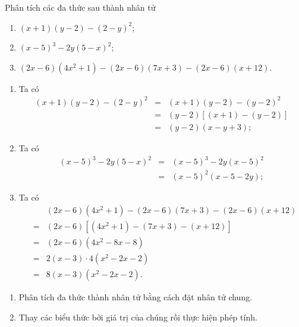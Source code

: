 \begin{vd}
		Phân tích các đa thức sau thành nhân tử
	\begin{enumerate}
			\item $(x+1)(y-2)-(2-y)^2$;
		\item $(x-5)^3 -2y(5-x)^2$;
		\item $(2x-6)(4x^2+1)- (2x-6)(7x+3)-(2x-6)(x+12)$.
	\end{enumerate}
	\loigiai
	{
		\begin{enumerate}
			\item Ta có  {\allowdisplaybreaks\begin{eqnarray*}
				(x+1)(y-2)-(2-y)^2 &=& (x+1)(y-2)-(y-2)^2 \\
				&=& (y-2)[(x+1)-(y-2)]\\
				&=& (y-2)(x-y+3);
			\end{eqnarray*}} 
			\item Ta có  {\allowdisplaybreaks\begin{eqnarray*}
				(x-5)^3 -2y(5-x)^2 &=& (x-5)^3 -2y(x-5)^2\\
				&=& (x-5)^2 (x-5-2y);
			\end{eqnarray*}}
			\item Ta có  {\allowdisplaybreaks\begin{eqnarray*}
				& & (2x-6)\left( 4x^2+1\right) - (2x-6)(7x+3)-(2x-6)(x+12)\\ &=& (2x-6) \left[ \left( 4x^2+1\right) - (7x+3) - (x+12)\right] \\
				&=& (2x-6)\left( 4x^2-8x-8 \right) \\
				&=& 2(x-3) \cdot 4(x^2-2x-2) \\
				&=& 8 (x-3)(x^2-2x-2).
			\end{eqnarray*}}
		\end{enumerate}	
	}
\end{vd}

\begin{dang}
	\begin{enumerate}[\tickEX]
		\item Phân tích đa thức thành nhân tử bằng cách đặt nhân tử chung.
		\item Thay các biểu thức bởi giá trị của chúng rồi thực hiện phép tính.
	\end{enumerate}
\end{dang}


